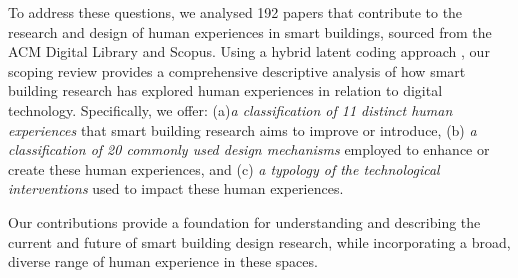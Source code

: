 To address these questions, we analysed 192 papers that contribute to the research and design of human experiences in smart buildings, sourced from the ACM Digital Library and Scopus. Using a hybrid latent coding approach \cite{braun2023thematic}, our scoping review provides a comprehensive descriptive analysis of how smart building research has explored human experiences in relation to digital technology. Specifically, we offer: (a)\emph{a classification of 11 distinct human experiences} that smart building research aims to improve or introduce, (b) \emph{a classification of 20 commonly used design mechanisms} employed to enhance or create these human experiences, and (c) \emph{a typology of the technological interventions} used to impact these human experiences.


Our contributions provide a foundation for understanding and describing the current and future of smart building design research, while incorporating a broad, diverse range of human experience in these spaces.  
